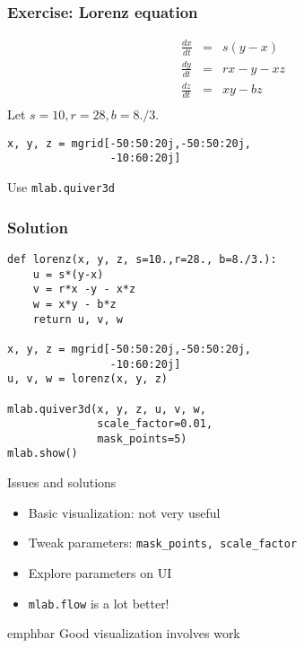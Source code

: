 \documentclass[14pt,compress]{beamer}
\newcommand{\emphbar}[1]
{\begin{beamercolorbox}[rounded=true]{emphbar} 
      {#1}
 \end{beamercolorbox}
}
\newcommand{\PythonCode}[1]{\lstinline{#1}}
\begin{document}
\begin{frame}
    \frametitle{Exercise: Lorenz equation}
    \begin{eqnarray*}
        \frac{d x}{dt} &=& s (y-x)\\
        \frac{d y}{d t} &=& rx -y -xz\\
        \frac{d z}{d t} &=& xy - bz\\
    \end{eqnarray*}
Let $s=10,r=28, b=8./3.$
\vspace*{0.2in}

  \begin{lstlisting}
x, y, z = mgrid[-50:50:20j,-50:50:20j,
                -10:60:20j]
 \end{lstlisting}

 Use \PythonCode{mlab.quiver3d}

\end{frame}

\begin{frame}
    \frametitle{Solution}
  \begin{lstlisting}
def lorenz(x, y, z, s=10.,r=28., b=8./3.):
    u = s*(y-x)
    v = r*x -y - x*z
    w = x*y - b*z
    return u, v, w

x, y, z = mgrid[-50:50:20j,-50:50:20j,
                -10:60:20j]
u, v, w = lorenz(x, y, z)

mlab.quiver3d(x, y, z, u, v, w,
              scale_factor=0.01,
              mask_points=5)
mlab.show()
 \end{lstlisting}
\end{frame}

\begin{frame}[plain]
    {Issues and solutions}

    \Large 

    \begin{itemize}

        \item Basic visualization: not very useful

        \item Tweak parameters: \PythonCode{mask_points, scale_factor}

        \item Explore parameters on UI

        \item \PythonCode{mlab.flow} is a lot better!

    \end{itemize}

    \emphbar{\alert{Good} visualization involves work}
 
\end{frame}
\end{document}
